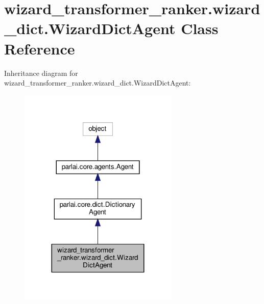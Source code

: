 \hypertarget{classwizard__transformer__ranker_1_1wizard__dict_1_1WizardDictAgent}{}\section{wizard\+\_\+transformer\+\_\+ranker.\+wizard\+\_\+dict.\+Wizard\+Dict\+Agent Class Reference}
\label{classwizard__transformer__ranker_1_1wizard__dict_1_1WizardDictAgent}


Inheritance diagram for wizard\+\_\+transformer\+\_\+ranker.\+wizard\+\_\+dict.\+Wizard\+Dict\+Agent\+:
\nopagebreak
\begin{figure}[H]
\begin{center}
\leavevmode
\includegraphics[width=215pt]{classwizard__transformer__ranker_1_1wizard__dict_1_1WizardDictAgent__inherit__graph}
\end{center}
\end{figure}


